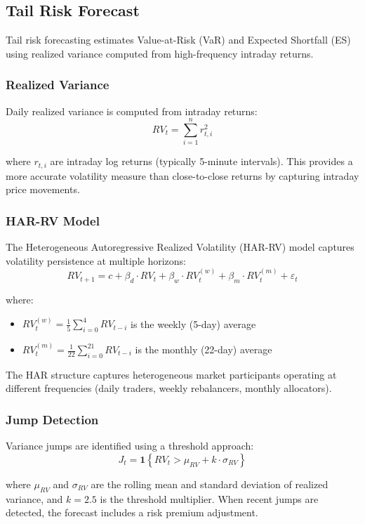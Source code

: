 \newpage\subsection{Tail Risk Forecast}

Tail risk forecasting estimates Value-at-Risk (VaR) and Expected Shortfall (ES) using realized variance computed from high-frequency intraday returns.

\subsubsection{Realized Variance}

Daily realized variance is computed from intraday returns:
\[
RV_t = \sum_{i=1}^{n} r_{t,i}^2
\]

where $r_{t,i}$ are intraday log returns (typically 5-minute intervals). This provides a more accurate volatility measure than close-to-close returns by capturing intraday price movements.

\subsubsection{HAR-RV Model}

The Heterogeneous Autoregressive Realized Volatility (HAR-RV) model captures volatility persistence at multiple horizons:
\[
RV_{t+1} = c + \beta_d \cdot RV_t + \beta_w \cdot RV_t^{(w)} + \beta_m \cdot RV_t^{(m)} + \varepsilon_t
\]

where:
\begin{itemize}
  \item $RV_t^{(w)} = \frac{1}{5}\sum_{i=0}^{4} RV_{t-i}$ is the weekly (5-day) average
  \item $RV_t^{(m)} = \frac{1}{22}\sum_{i=0}^{21} RV_{t-i}$ is the monthly (22-day) average
\end{itemize}

The HAR structure captures heterogeneous market participants operating at different frequencies (daily traders, weekly rebalancers, monthly allocators).

\subsubsection{Jump Detection}

Variance jumps are identified using a threshold approach:
\[
J_t = \mathbf{1}\left\{ RV_t > \mu_{RV} + k \cdot \sigma_{RV} \right\}
\]

where $\mu_{RV}$ and $\sigma_{RV}$ are the rolling mean and standard deviation of realized variance, and $k = 2.5$ is the threshold multiplier. When recent jumps are detected, the forecast includes a risk premium adjustment.

